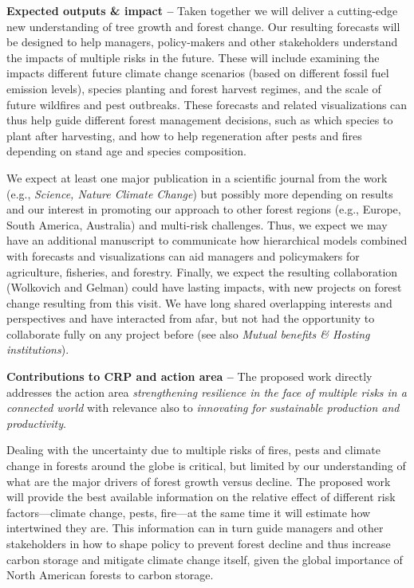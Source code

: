 \documentclass[11pt]{article}
\begin{document}
{\bf Expected outputs \& impact -- } Taken together we will deliver a cutting-edge new understanding of tree growth and forest change. Our resulting forecasts will be designed to help managers, policy-makers and other stakeholders understand the impacts of multiple risks in the future. These will include examining the impacts different future climate change scenarios (based on different fossil fuel emission levels), species planting and forest harvest regimes, and the scale of future wildfires and pest outbreaks. These forecasts and related visualizations can thus help guide different forest management decisions, such as which species to plant after harvesting, and how to help regeneration after pests and fires depending on stand age and species composition. %

We expect at least one major publication in a scientific journal from the work (e.g., \emph{Science, Nature Climate Change}) but possibly more depending on results and our interest in promoting our approach to other forest regions (e.g., Europe, South America, Australia) and multi-risk challenges. Thus, we expect we may have an additional manuscript to communicate how hierarchical models combined with forecasts and visualizations can aid managers and policymakers for agriculture, fisheries, and forestry. Finally, we expect the resulting collaboration (Wolkovich and Gelman) could have lasting impacts, with new projects on forest change resulting from this visit. We have long shared overlapping interests and perspectives and have interacted from afar, but not had the opportunity to collaborate fully on any project before (see also \emph{Mutual benefits \& Hosting institutions}). 

{\bf Contributions to CRP and action area -- }The proposed work directly addresses the action area \emph{strengthening resilience in the face of multiple risks in a connected world} with relevance also to \emph{innovating for sustainable production and productivity}. 

Dealing with the uncertainty due to multiple risks of fires, pests and climate change in forests around the globe is critical, but limited by our understanding of what are the major drivers of forest growth versus decline. The proposed work will provide the best available information on the relative effect of different risk factors---climate change, pests, fire---at the same time it will estimate how intertwined they are. This information can in turn guide managers and other stakeholders in how to shape policy to prevent forest decline and thus increase carbon storage and mitigate climate change itself, given the global importance of North American forests to carbon storage. 
\end{document}
